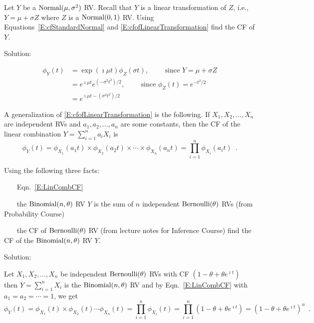 \begin{example}
Let $Y$ be a $\mbox{{\rm Normal}}(\mu,\sigma^2)$ RV.  
Recall that $Y$ is a linear transformation of $Z$, i.e., $Y = \mu + \sigma Z$ where $Z$ is a $\mbox{{\rm Normal}}(0,1)$ RV.  
Using Equations~\eqref{E:cfStandardNormal} and \eqref{E:cfofLinearTransformation} find the CF of $Y$.

Solution:

\begin{align*}
\phi_Y(t) 
& = \exp(\imath \mu t) \phi_Z(\sigma t), \qquad \text{ since $Y = \mu + \sigma Z$}\\
& = e^{\imath \mu t} e^{(-\sigma^2 t^2)/2}, \qquad \text{ since $\phi_Z(t)=e^{-t^2/2}$}\\
& = e^{\imath \mu t - (\sigma^2 t^2)/2}
\end{align*}
\end{example}

A generalization of \eqref{E:cfofLinearTransformation} is the following.  
If $X_1,X_2,\ldots,X_n$ are independent RVs and $a_1,a_2,\ldots,a_n$ are some constants, then the CF of the linear combination $Y=\sum_{i=1}^n a_i X_i$ is
\begin{equation}\label{E:LinCombCF} 
\boxed{
\phi_Y (t) = \phi_{X_1} (a_1 t) \times \phi_{X_2} (a_2 t) \times \cdots \times \phi_{X_n} (a_n t) = \prod_{i=1}^n \phi_{X_i} (a_i t) \enspace .
}
\end{equation}
\begin{example}
Using the following three facts:
\bit 
\item~~~ Eqn.~\eqref{E:LinCombCF} 
\item~~~ the $\mbox{{\rm Binomial}}(n,\theta)$ RV $Y$ is the sum of $n$ independent $\mbox{{\rm Bernoulli}}(\theta)$ RVs (from Probability Course)  
\item~~~ the CF of $\mbox{{\rm Bernoulli}}(\theta)$ RV (from lecture notes for Inference Course)
\eit
find the CF of the $\mbox{{\rm Binomial}}(n,\theta)$ RV $Y$.

Solution:

Let $X_1,X_2,\ldots,X_n$ be independent $\mbox{{\rm Bernoulli}}(\theta)$ RVs with CF $\left( 1-\theta + \theta e^{\imath t} \right)$ then $Y=\sum_{i=1}^n  X_i$ is the $\mbox{{\rm Binomial}}(n,\theta)$ RV and by Eqn.~\eqref{E:LinCombCF} 
with $a_1=a_2=\cdots=1$, we get
\[
\phi_Y (t) = \phi_{X_1} ( t) \times \phi_{X_2} (t) \cdots \phi_{X_n} ( t)
= \prod_{i=1}^n \phi_{X_i} ( t) = \prod_{i=1}^n \left( 1-\theta + \theta e^{\imath t} \right)
= \left( 1-\theta + \theta e^{\imath t} \right)^n \enspace . 
\]
\end{example}

